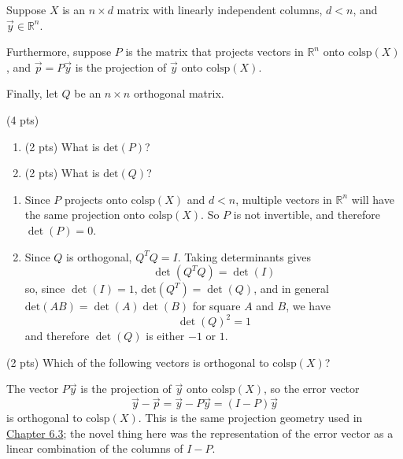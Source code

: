 \documentclass[11pt]{article}
\begin{document}
\begin{prob}
Suppose $X$ is an $n \times d$ matrix with linearly independent columns, $d<n$, and $\vec y \in \mathbb{R}^n$.

Furthermore, suppose $P$ is the matrix that projects vectors in $\mathbb{R}^n$ onto $\text{colsp}(X)$, and $\vec p = P \vec y$ is the projection of $\vec y$ onto $\text{colsp}(X)$.

Finally, let $Q$ be an $n \times n$ orthogonal matrix.

\begin{subprob}(4 pts)
\begin{enumerate}[label=(\roman*)]
    \item (2 pts) What is $\text{det}(P)$? \quad {}    
    \item (2 pts) What is $\text{det}(Q)$? \quad {}    
\end{enumerate}
\begin{solution}
\begin{enumerate}[label=(\roman*)]
    \item Since $P$ projects onto $\text{colsp}(X)$ and $d<n$, multiple vectors in $\mathbb{R}^n$ will have the same projection onto $\text{colsp}(X)$. So $P$ is not invertible, and therefore $\det(P)=0$.
    \item Since $Q$ is orthogonal, $Q^TQ=I$. Taking determinants gives
    \[
    \det(Q^TQ)=\det(I)
    \]
    so, since $\det(I)=1$, $\text{det}(Q^T) = \det(Q)$, and in general $\text{det}(AB) = \det(A)\det(B)$ for square $A$ and $B$, we have
    \[
    \det(Q)^2=1
    \]
    and therefore $\det(Q)$ is either $-1$ or $1$.
\end{enumerate}
\end{solution}
\end{subprob}

\begin{subprob}(2 pts) Which of the following vectors is orthogonal to $\text{colsp}(X)$?

     

\begin{solution}
The vector $P\vec{y}$ is the projection of $\vec{y}$ onto $\text{colsp}(X)$, so the error vector
\[
\vec y - \vec p = \vec{y}-P\vec{y}=(I-P)\vec{y}
\]
is orthogonal to $\text{colsp}(X)$. This is the same projection geometry used in \href{https://notes.eecs245.org/linear-transformations-and-projections/projecting-onto-column-space/}{Chapter 6.3}; the novel thing here was the representation of the error vector as a linear combination of the columns of $I-P$.
\end{solution}
\end{subprob}


\end{prob}
\end{document}
